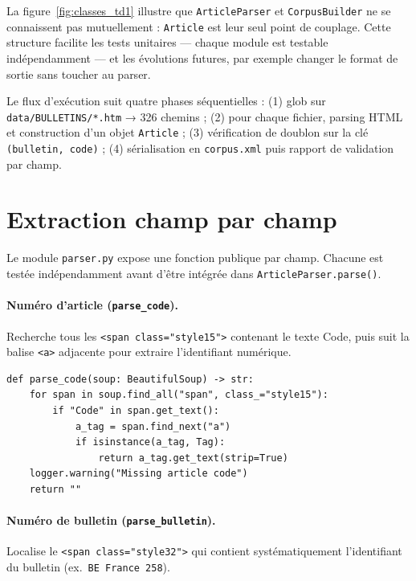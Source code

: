 La figure~\ref{fig:classes_td1} illustre que \texttt{ArticleParser} et
\texttt{CorpusBuilder} ne se connaissent pas mutuellement : \texttt{Article} est leur
seul point de couplage. Cette structure facilite les tests unitaires — chaque module
est testable indépendamment — et les évolutions futures, par exemple changer le format
de sortie sans toucher au parser.

Le flux d'exécution suit quatre phases séquentielles : (1) glob sur
\texttt{data/BULLETINS/*.htm} → 326 chemins ; (2) pour chaque fichier, parsing HTML
et construction d'un objet \texttt{Article} ; (3) vérification de doublon sur la clé
\texttt{(bulletin, code)} ; (4) sérialisation en \texttt{corpus.xml} puis rapport de
validation par champ.

\section{Extraction champ par champ}

Le module \texttt{parser.py} expose une fonction publique par champ. Chacune est testée
indépendamment avant d'être intégrée dans \texttt{ArticleParser.parse()}.

\paragraph{Numéro d'article (\texttt{parse\_code}).}
Recherche tous les \texttt{<span class="style15">} contenant le texte \og{}Code\fg{},
puis suit la balise \texttt{<a>} adjacente pour extraire l'identifiant numérique.

\begin{lstlisting}[caption={Extraction du numéro d'article par navigation sur les ancres},
  label={lst:parse_code}]
def parse_code(soup: BeautifulSoup) -> str:
    for span in soup.find_all("span", class_="style15"):
        if "Code" in span.get_text():
            a_tag = span.find_next("a")
            if isinstance(a_tag, Tag):
                return a_tag.get_text(strip=True)
    logger.warning("Missing article code")
    return ""
\end{lstlisting}

\paragraph{Numéro de bulletin (\texttt{parse\_bulletin}).}
Localise le \texttt{<span class="style32">} qui contient systématiquement l'identifiant
du bulletin (ex.\ \texttt{BE France 258}).

